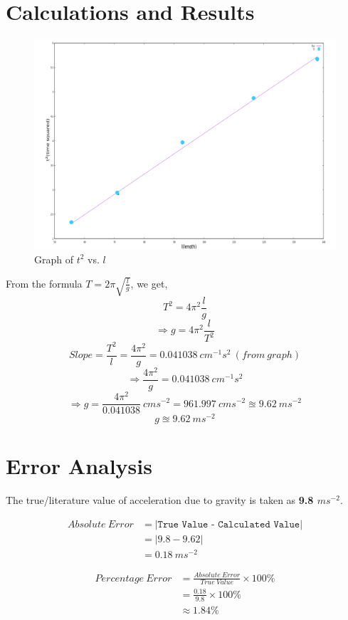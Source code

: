 \documentclass[12pt]{article}
\begin{document}
	\section{Calculations and Results}
	
	\begin{figure}[H]
		\centering
		\includegraphics[scale=0.7]{photo}
		\caption{Graph of $t^{2}$ vs. $l$}
	\end{figure}

	From the formula $T = 2\pi \sqrt{\frac{l}{g}}$, we get, $$T^{2} = 4\pi^{2} \frac{l}{g}$$
	$$\Rightarrow g = 4\pi^{2} \frac{l}{T^{2}}$$
	$$Slope = \frac{T^{2}}{l} = \frac{4\pi^{2}}{g} = 0.041038\ cm^{-1} s^{2}\ (from\ graph)$$
	$$\Rightarrow \frac{4\pi^{2}}{g} = 0.041038\ cm^{-1} s^{2}$$
	$$\Rightarrow g = \frac{4\pi^{2}}{ 0.041038}\ cms^{-2} = 961.997\ cms^{-2} \approxeq 9.62\ ms^{-2}$$
	$$\boxed{g \approxeq 9.62\ ms^{-2}}$$
	
	\section{Error Analysis}
	
	The true/literature value of acceleration due to gravity is taken as \textbf{9.8 \emph{$ms^{-2}$}}. 
	
	\begin{align*} 
	Absolute\ Error &= |\texttt{True\ Value - Calculated\ Value}|\\
	&= |9.8 - 9.62|\\
	&= 0.18\ ms^{-2}
	\end{align*}

	\begin{align*}
		Percentage\ Error &= \frac{Absolute\ Error}{True\ Value} \times 100\%\\
		&= \frac{0.18}{9.8} \times 100\% \\
		&\approx 1.84\%
	\end{align*}
\end{document}
